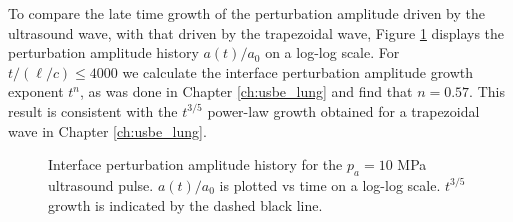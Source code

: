 To compare the late time growth of the perturbation amplitude driven
by the ultrasound wave, with that driven by the trapezoidal wave,
Figure \ref{fig:us10_interface_growth} displays the perturbation
amplitude history $a(t)/a_0$ on a log-log scale. For
$t/(\ell/c)\leq 4000$ we calculate the interface perturbation
amplitude growth exponent $t^n$, as was done in Chapter
\ref{ch:usbe_lung} and find that $n = 0.57$. This result is consistent
with the $t^{3/5}$ power-law growth obtained for a trapezoidal wave in
Chapter \ref{ch:usbe_lung}.
\begin{figure}
  \captionsetup[subfigure]{labelformat=empty}
  \centering
  \centering
  \caption[Interface perturbation amplitude history for the
  $p_a=10$ MPa ultrasound pulse.]{Interface perturbation amplitude
    history for the $p_a=10$ MPa ultrasound pulse. $a(t)/a_0$ is
    plotted vs time on a log-log scale. $t^{3/5}$ growth is
    indicated by the dashed black line.}
  \label{fig:us10_interface_growth}
\end{figure}%
% 

